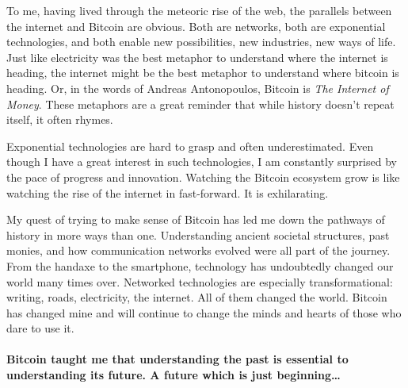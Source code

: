 To me, having lived through the meteoric rise of the web, the parallels
between the internet and Bitcoin are obvious. Both are networks, both
are exponential technologies, and both enable new possibilities, new
industries, new ways of life. Just like electricity was the best
metaphor to understand where the internet is heading, the internet might
be the best metaphor to understand where bitcoin is heading. Or, in the
words of Andreas Antonopoulos, Bitcoin is \textit{The Internet of Money}.
These metaphors are a great reminder that while history doesn't repeat
itself, it often rhymes.

Exponential technologies are hard to grasp and often underestimated.
Even though I have a great interest in such technologies, I am
constantly surprised by the pace of progress and innovation. Watching
the Bitcoin ecosystem grow is like watching the rise of the internet in
fast-forward. It is exhilarating.

My quest of trying to make sense of Bitcoin has led me down the pathways
of history in more ways than one. Understanding ancient societal
structures, past monies, and how communication networks evolved were all
part of the journey. From the handaxe to the smartphone, technology has
undoubtedly changed our world many times over. Networked technologies
are especially transformational: writing, roads, electricity, the
internet. All of them changed the world. Bitcoin has changed mine and
will continue to change the minds and hearts of those who dare to use
it.

\paragraph{Bitcoin taught me that understanding the past is essential to
understanding its future. A future which is just beginning\ldots}

